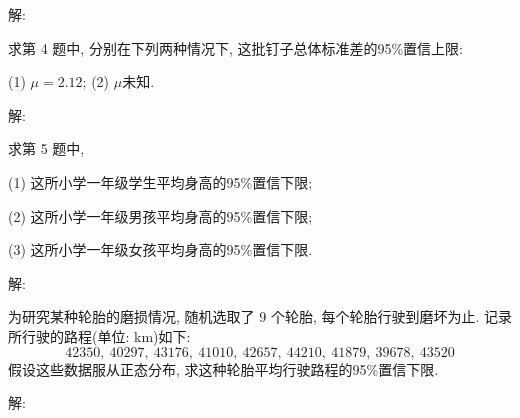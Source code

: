 \documentclass[standard]{ExBook}
\begin{document}
\begin{qitems}
    \begin{bbox}
解: 
    \end{bbox}

\vspace{-5em}

    \begin{bbox}
    \begin{shaded}
        \qitem
求第 4 题中, 分别在下列两种情况下, 这批钉子总体标准差的95\%置信上限:

(1) $\mu=2.12$; \qquad (2) $\mu$未知.
    \end{shaded}
    \end{bbox}

\vspace{-5em}

    \begin{bbox}
解: 
    \end{bbox}

\vspace{-5em}

    \begin{bbox}
    \begin{shaded}
        \qitem
求第 5 题中,

(1) 这所小学一年级学生平均身高的95\%置信下限;

(2) 这所小学一年级男孩平均身高的95\%置信下限;

(3) 这所小学一年级女孩平均身高的95\%置信下限.
    \end{shaded}
    \end{bbox}

\vspace{-5em}

    \begin{bbox}
解: 
    \end{bbox}

\vspace{-5em}

    \begin{bbox}
    \begin{shaded}
        \qitem
为研究某种轮胎的磨损情况, 随机选取了 9 个轮胎, 每个轮胎行驶到磨坏为止. 记录所行驶的路程(单位: km)如下:
$$42350,\ 40297,\ 43176,\ 41010,\ 42657,\ 44210,\ 41879,\ 39678,\ 43520$$
假设这些数据服从正态分布, 求这种轮胎平均行驶路程的95\%置信下限.
    \end{shaded}
    \end{bbox}

\vspace{-5em}

    \begin{bbox}
解: 
    \end{bbox}


\end{qitems}
\end{document}
